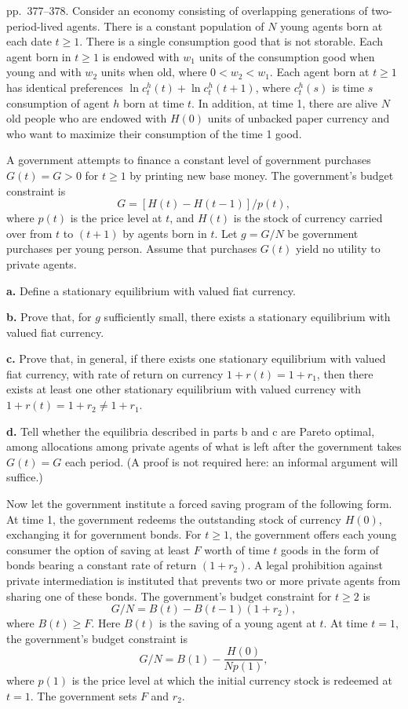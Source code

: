 \documentclass[12pt, letterpaper]{article}
\begin{document}
\begin{tcolorbox}[oddbox,title={Exercise 9.13 \quad Bryant--Keynes--Wallace}]
\begin{tcolorbox}[questionbox]
pp.~377--378. Consider an economy consisting of overlapping generations of two-period-lived agents.
There is a constant population of $N$ young agents born at each date $t\ge1$. There is a single
consumption good that is not storable. Each agent born in $t\ge1$ is endowed with $w_1$ units of the
consumption good when young and with $w_2$ units when old, where $0<w_2<w_1$. Each agent born at
$t\ge1$ has identical preferences $\ln c_t^h(t)+\ln c_t^h(t+1)$, where $c_t^h(s)$ is time $s$
consumption of agent $h$ born at time $t$. In addition, at time 1, there are alive $N$ old people who
are endowed with $H(0)$ units of unbacked paper currency and who want to maximize their consumption
of the time 1 good.

A government attempts to finance a constant level of government purchases $G(t)=G>0$ for $t\ge1$ by
printing new base money. The government's budget constraint is
\[
G=[H(t)-H(t-1)]/p(t),
\]
where $p(t)$ is the price level at $t$, and $H(t)$ is the stock of currency carried over from $t$ to
$(t+1)$ by agents born in $t$. Let $g=G/N$ be government purchases per young person. Assume that
purchases $G(t)$ yield no utility to private agents.

\textbf{a.} Define a stationary equilibrium with valued fiat currency.

\textbf{b.} Prove that, for $g$ sufficiently small, there exists a stationary equilibrium with valued
fiat currency.

\textbf{c.} Prove that, in general, if there exists one stationary equilibrium with valued fiat
currency, with rate of return on currency $1+r(t)=1+r_1$, then there exists at least one other
stationary equilibrium with valued currency with $1+r(t)=1+r_2\ne1+r_1$.

\textbf{d.} Tell whether the equilibria described in parts b and c are Pareto optimal, among
allocations among private agents of what is left after the government takes $G(t)=G$ each period.
(A proof is not required here: an informal argument will suffice.)

Now let the government institute a forced saving program of the following form. At time 1, the
government redeems the outstanding stock of currency $H(0)$, exchanging it for government bonds. For
$t\ge1$, the government offers each young consumer the option of saving at least $F$ worth of time
$t$ goods in the form of bonds bearing a constant rate of return $(1+r_2)$. A legal prohibition
against private intermediation is instituted that prevents two or more private agents from sharing
one of these bonds. The government's budget constraint for $t\ge2$ is
\[
G/N=B(t)-B(t-1)(1+r_2),
\]
where $B(t)\ge F$. Here $B(t)$ is the saving of a young agent at $t$. At time $t=1$, the government's
budget constraint is
\[
G/N=B(1)-\frac{H(0)}{Np(1)},
\]
where $p(1)$ is the price level at which the initial currency stock is redeemed at $t=1$. The
government sets $F$ and $r_2$.


\end{tcolorbox}
\end{tcolorbox}
\end{document}
